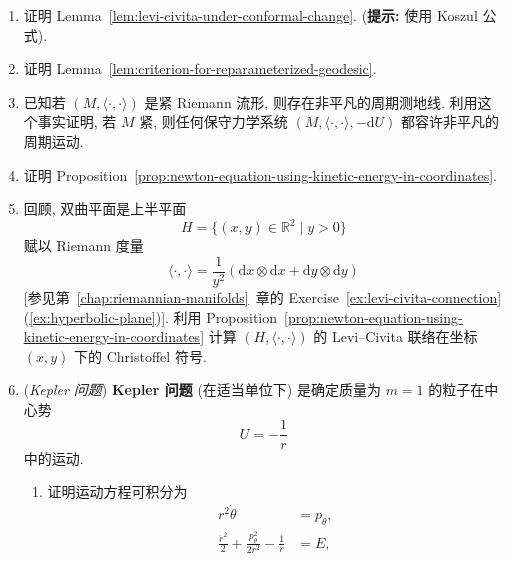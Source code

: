 \begin{RiemannExercise}
\begin{enumerate}[label=(\arabic*),ref=\arabic*,leftmargin=*]
\begin{enumerate}[label=(\alph*),leftmargin=*]
\item 该流的不动点形如 $(x_0,0)$, 其中 $x_0$ 是 $U$ 的临界点;
\item 若 $x_0$ 是 $U$ 的极大值点且 $U''(x_0)<0$, 则 $(x_0,0)$ 是不稳定不动点;
\item 若 $x_0$ 是 $U$ 的极小值点且 $U''(x_0)>0$, 则 $(x_0,0)$ 是稳定不动点, 并且有由周期轨道组成的任意小的邻域;
\item 当这些轨道趋近 $(x_0,0)$ 时, 其周期趋于 $2\pi U''(x_0)^{-\frac12}$;
\item $\dim M=1$ 的任何保守力学系统 $(M,\langle\cdot,\cdot\rangle,-\mathrm{d}U)$ 局部都具有上述形式.
\end{enumerate}
\item\label{ex:prove-levi-civita-under-conformal-change} 证明 Lemma~\ref{lem:levi-civita-under-conformal-change}.
{\small (\textbf{提示:} 使用 Koszul 公式).}
\item\label{ex:prove-criterion-for-reparameterized-geodesic} 证明 Lemma~\ref{lem:criterion-for-reparameterized-geodesic}.
\item\label{ex:periodic-motion-of-compact-system} 已知若 $(M,\langle\cdot,\cdot\rangle)$ 是紧 Riemann 流形, 则存在非平凡的周期测地线. 利用这个事实证明, 若 $M$ 紧, 则任何保守力学系统 $(M,\langle\cdot,\cdot\rangle,-\mathrm{d}U)$ 都容许非平凡的周期运动.
\item\label{ex:derive-newton-equation-in-coordinates} 证明 Proposition~\ref{prop:newton-equation-using-kinetic-energy-in-coordinates}.
\item\label{ex:christoffel-symbols-of-hyperbolic-plane-by-newton-equation} 回顾, 双曲平面是上半平面
\[
  H=\{(x,y)\in\mathbb{R}^2\mid y>0\}
\]
赋以 Riemann 度量
\[
  \langle\cdot,\cdot\rangle=\frac1{y^2}(\mathrm{d}x\otimes\mathrm{d}x+\mathrm{d}y\otimes\mathrm{d}y)
\]
[参见第~\ref{chap:riemannian-manifolds}~章的 Exercise~\ref{ex:levi-civita-connection}(\ref{ex:hyperbolic-plane})]. 利用 Proposition~\ref{prop:newton-equation-using-kinetic-energy-in-coordinates} 计算 $(H,\langle\cdot,\cdot\rangle)$ 的 Levi–Civita 联络在坐标 $(x,y)$ 下的 Christoffel 符号.
\item\label{ex:kepler-problem} (\emph{Kepler 问题}) \textbf{Kepler 问题} (在适当单位下) 是确定质量为 $m=1$ 的粒子在中心势
\[
  U=-\frac1r
\]
中的运动.
\begin{enumerate}[label=(\alph*),leftmargin=*]
\item 证明运动方程可积分为
\begin{align*}
  r^2\dot\theta&=p_\theta,\\
  \frac{\dot r^2}{2}+\frac{p_\theta^2}{2r^2}-\frac1r&=E,

\end{align*}
\end{enumerate}
\end{enumerate}
\end{RiemannExercise}

